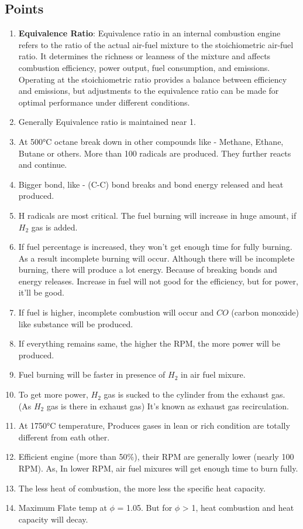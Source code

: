 \documentclass{article}
\begin{document}
\subsection*{Points}
\begin{enumerate}
  \item \textbf{Equivalence Ratio}: Equivalence ratio in an internal combustion engine refers to the ratio of the actual air-fuel mixture to the stoichiometric air-fuel ratio. It determines the richness or leanness of the mixture and affects combustion efficiency, power output, fuel consumption, and emissions. Operating at the stoichiometric ratio provides a balance between efficiency and emissions, but adjustments to the equivalence ratio can be made for optimal performance under different conditions. 
  \item Generally Equivalence ratio is maintained near 1. 
  \item At 500°C octane break down in other compounds like - Methane, Ethane, Butane or others. More than 100 radicals are produced. They further reacts and continue. 
  \item Bigger bond, like - (C-C) bond breaks and bond energy released and heat produced.
  \item H radicals are most critical. The fuel burning will increase in huge amount, if $H_2$ gas is added. 
  \item If fuel percentage is increased, they won't get enough time for fully burning. As a result incomplete burning will occur. Although there will be incomplete burning, there will produce a lot energy. Because of breaking bonds and energy releases. Increase in fuel will not good for the efficiency, but for power, it'll be good. 
  \item If fuel is higher, incomplete combustion will occur and $CO$ (carbon monoxide) like substance will be produced. 
  \item If everything remains same, the higher the RPM, the more power will be produced. 
  \item Fuel burning will be faster in presence of $H_2$ in air fuel mixure. 
  \item To get more power, $H_2$ gas is sucked to the cylinder from the exhaust gas. (As $H_2$ gas is there in exhaust gas) It's known as exhaust gas recirculation. 
  \item At 1750°C temperature, Produces gases in lean or rich condition are  totally different from eath other.
  \item Efficient engine (more than 50\%), their RPM are generally lower (nearly 100 RPM). As, In lower RPM, air fuel mixures will get enough time to burn fully.
  \item The less heat of combustion, the more less the specific heat capacity. 
  \item Maximum Flate temp at $\phi$ = 1.05. But for $\phi$ > 1, heat combustion and heat capacity will decay. 
\end{enumerate}
\end{document}
